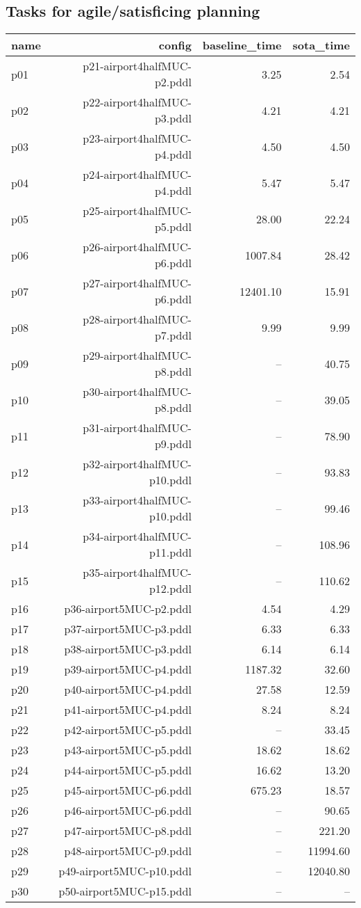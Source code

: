 \documentclass{article}
\begin{document}
                    \subsection*{Tasks for agile/satisficing planning}
                    
                            \begin{center}
                            \scriptsize
                            \begin{tabular}{@{}l|r|r|r@{}}
                            name & config & baseline\_time & sota\_time\\\midrule
                              p01& p21-airport4halfMUC-p2.pddl&3.25&2.54\\
  p02& p22-airport4halfMUC-p3.pddl&4.21&4.21\\
  p03& p23-airport4halfMUC-p4.pddl&4.50&4.50\\
  p04& p24-airport4halfMUC-p4.pddl&5.47&5.47\\
  p05& p25-airport4halfMUC-p5.pddl&28.00&22.24\\
  p06& p26-airport4halfMUC-p6.pddl&1007.84&28.42\\
  p07& p27-airport4halfMUC-p6.pddl&12401.10&15.91\\
  p08& p28-airport4halfMUC-p7.pddl&9.99&9.99\\
  p09& p29-airport4halfMUC-p8.pddl&--&40.75\\
  p10& p30-airport4halfMUC-p8.pddl&--&39.05\\
  p11& p31-airport4halfMUC-p9.pddl&--&78.90\\
  p12& p32-airport4halfMUC-p10.pddl&--&93.83\\
  p13& p33-airport4halfMUC-p10.pddl&--&99.46\\
  p14& p34-airport4halfMUC-p11.pddl&--&108.96\\
  p15& p35-airport4halfMUC-p12.pddl&--&110.62\\
  p16& p36-airport5MUC-p2.pddl&4.54&4.29\\
  p17& p37-airport5MUC-p3.pddl&6.33&6.33\\
  p18& p38-airport5MUC-p3.pddl&6.14&6.14\\
  p19& p39-airport5MUC-p4.pddl&1187.32&32.60\\
  p20& p40-airport5MUC-p4.pddl&27.58&12.59\\
  p21& p41-airport5MUC-p4.pddl&8.24&8.24\\
  p22& p42-airport5MUC-p5.pddl&--&33.45\\
  p23& p43-airport5MUC-p5.pddl&18.62&18.62\\
  p24& p44-airport5MUC-p5.pddl&16.62&13.20\\
  p25& p45-airport5MUC-p6.pddl&675.23&18.57\\
  p26& p46-airport5MUC-p6.pddl&--&90.65\\
  p27& p47-airport5MUC-p8.pddl&--&221.20\\
  p28& p48-airport5MUC-p9.pddl&--&11994.60\\
  p29& p49-airport5MUC-p10.pddl&--&12040.80\\
  p30& p50-airport5MUC-p15.pddl&--&--
                            \end{tabular}
                            \end{center}
\end{document}
